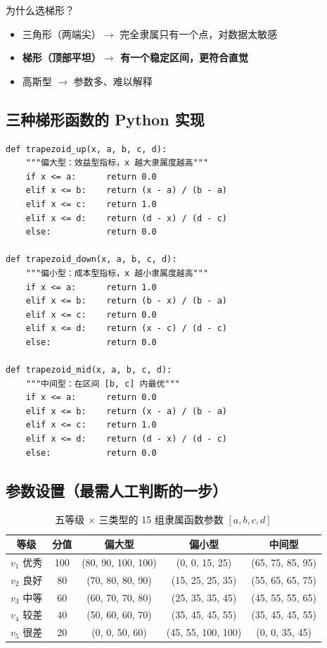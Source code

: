 \documentclass[a4paper,11pt]{ctexart}
\begin{document}
为什么选梯形？
\begin{itemize}
    \item 三角形（两端尖）$\to$ 完全隶属只有一个点，对数据太敏感
    \item \textbf{梯形（顶部平坦）$\to$ 有一个稳定区间，更符合直觉}
    \item 高斯型 $\to$ 参数多、难以解释
\end{itemize}

\subsection{三种梯形函数的 Python 实现}

\begin{lstlisting}
def trapezoid_up(x, a, b, c, d):
    """偏大型：效益型指标，x 越大隶属度越高"""
    if x <= a:      return 0.0
    elif x <= b:    return (x - a) / (b - a)
    elif x <= c:    return 1.0
    elif x <= d:    return (d - x) / (d - c)
    else:           return 0.0

def trapezoid_down(x, a, b, c, d):
    """偏小型：成本型指标，x 越小隶属度越高"""
    if x <= a:      return 1.0
    elif x <= b:    return (b - x) / (b - a)
    elif x <= c:    return 0.0
    elif x <= d:    return (x - c) / (d - c)
    else:           return 0.0

def trapezoid_mid(x, a, b, c, d):
    """中间型：在区间 [b, c] 内最优"""
    if x <= a:      return 0.0
    elif x <= b:    return (x - a) / (b - a)
    elif x <= c:    return 1.0
    elif x <= d:    return (d - x) / (d - c)
    else:           return 0.0
\end{lstlisting}

\subsection{参数设置（最需人工判断的一步）}

\begin{table}[H]
\centering
\caption{五等级 $\times$ 三类型的 15 组隶属函数参数 $[a,b,c,d]$}
\begin{tabular}{ccccc}
\toprule
等级 & 分值 & 偏大型 & 偏小型 & 中间型 \\
\midrule
$v_1$ 优秀 & 100 & (80, 90, 100, 100) & (0, 0, 15, 25)  & (65, 75, 85, 95) \\
$v_2$ 良好 & 80  & (70, 80, 80, 90)   & (15, 25, 25, 35) & (55, 65, 65, 75) \\
$v_3$ 中等 & 60  & (60, 70, 70, 80)   & (25, 35, 35, 45) & (45, 55, 55, 65) \\
$v_4$ 较差 & 40  & (50, 60, 60, 70)   & (35, 45, 45, 55) & (35, 45, 45, 55) \\
$v_5$ 很差 & 20  & (0, 0, 50, 60)     & (45, 55, 100, 100) & (0, 0, 35, 45) \\
\bottomrule
\end{tabular}
\end{table}
\end{document}
